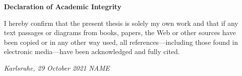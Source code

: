 {\Large \textbf{Declaration of Academic Integrity}}

\bigskip
I hereby confirm that the present thesis is solely my own work and that if any text passages or diagrams from books, papers, the Web or
other sources have been copied or in any other way used, all references---including those found in
electronic media---have been acknowledged and fully cited. \\




\vspace{1cm}

\textit{Karlsruhe, 29 October 2021} \hspace{4cm} \textit{NAME} \\
